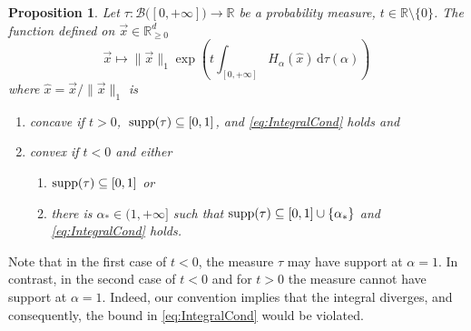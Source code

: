\documentclass[aps,pra,11pt,onecolumn,nofootinbib,tightenlines]{revtex4-2}
\newtheorem{proposition}[theorem]{Proposition}
\theoremstyle{definition}
\def \d {\mathrm{d}}
\newcommand{\R}{\mathbb{R}}
\newcommand{\mc}[1]{\mathcal{#1}}
\newcommand{\mb}[1]{\mathbb{#1}}
\begin{document}
\begin{proposition}\label{prop: sufficient conditions}
Let $\tau:\mc B\big([0,+\infty]\big)\to\mb R$ be a probability measure, $t\in\R\setminus\{0\}$. The function defined on $\vec{x}\in\R^d_{\geq 0}$ 
\begin{equation}
\vec{x} \longmapsto \|\vec{x}\|_1 \exp\left( t\int_{[0,+\infty]} H_\alpha(\hat{x}) \,\d\tau(\alpha) \right)
\end{equation}
where $\hat{x}=\vec{x}/\|\vec{x}\|_1$ is
\begin{enumerate}
\item concave if $t>0$, $\;\textup{supp}(\tau) \subseteq [0,1]$, and \eqref{eq:IntegralCond} holds and 
\label{it: first sufficient}
\item convex if $t<0$ and either
\begin{enumerate}[label=(\alph*),ref=2(\alph*)]
 \item $\textup{supp}(\tau)\subseteq[0,1]$ or
\label{it: second sufficient (a)}
 \item there is $\alpha_*\in(1,+\infty]$ such that $\textup{supp}(\tau)\subseteq[0,1]\cup\{\alpha_*\}$ and \eqref{eq:IntegralCond} holds.
\label{it: second sufficient (b)}
\end{enumerate}
\end{enumerate}
\end{proposition}
Note that in the first case of  $t<0$, the measure $\tau$ may have support at $\alpha=1$.  In contrast, in the second case of \(t < 0\) and for \(t > 0\) the measure cannot have support at \(\alpha = 1\). Indeed, our convention implies that the integral diverges, and consequently, the bound in \eqref{eq:IntegralCond} would be violated.
\end{document}

